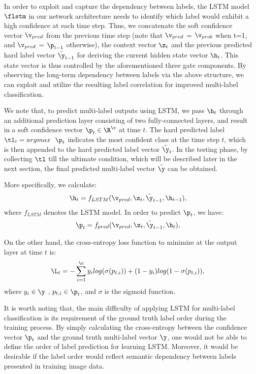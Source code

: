 \documentclass[letterpaper]{article} %
\begin{document}
In order to exploit and capture the dependency between labels, the LSTM model $\flstm$ in our network architecture needs to identify which label would exhibit a high confidence at each time step. Thus, we concatenate the soft confidence vector $\v_{pred}$ from the previous time step (note that $\v_{pred}$ = $\v_{prob}$ when t=1, and $\v_{pred}$ = $\p_{t-1}$ otherwise), the context vector $\z_t$ and the previous predicted hard label vector $\tilde{\y}_{t-1}$ for deriving the current hidden state vector $\h_t$. This state vector is thus controlled by the aforementioned three gate components. By observing the long-term dependency between labels via the above structure, we can exploit and utilize the resulting label correlation for improved multi-label classification.

We note that, to predict multi-label outputs using LSTM, we pass $\h_t$ through an additional prediction layer consisting of two fully-connected layers, and result in a soft confidence vector $\p_t \in \R^\c$ at time $t$. The hard predicted label $\tl_t = argmax~~\p_t$ indicates the most confident class at the time step $t$, which is then appended to the hard predicted label vector $\tilde{\y}_t$. In the testing phase, by collecting $\tl$ till the ultimate condition, which will be described later in the next section, the final predicted multi-label vector $\tilde{\y}$ can be obtained.

More specifically, we calculate:
\begin{equation}
\label{eq:hidden}
\h_t = f_{LSTM}(\v_{pred}, \z_t, \tilde{\y}_{t-1}, \h_{t-1}),
\end{equation}
where $f_{LSTM}$ denotes the LSTM model. In order to predict $\p_t$, we have:
\begin{equation}
\label{eq:prob}
\p_t = f_{pred}(\v_{pred}, \z_t, \tilde{\y}_{t-1}, \h_t),
\end{equation}


On the other hand, the cross-entropy loss function to minimize at the output layer at time $t$ is:
\begin{equation}
\label{eq:loss}
\L_t = -\sum^{\c}_{i=1} y_i log(\sigma(p_{t,i})) + (1 - y_i)log(1 - \sigma(p_{t,i})),
\end{equation}
where $y_i \in \y$ , $p_{t,i} \in \p_t$, and $\sigma$ is the sigmoid function.

It is worth noting that, the main difficulty of applying LSTM for multi-label classification is its requirement of the ground truth label order during the training process. By simply calculating the cross-entropy between the confidence vector $\p_t$ and the ground truth multi-label vector $\y$, one would not be able to define the order of label prediction for learning LSTM. Moreover, it would be desirable if the label order would reflect semantic dependency between labels presented in training image data.
\end{document}
